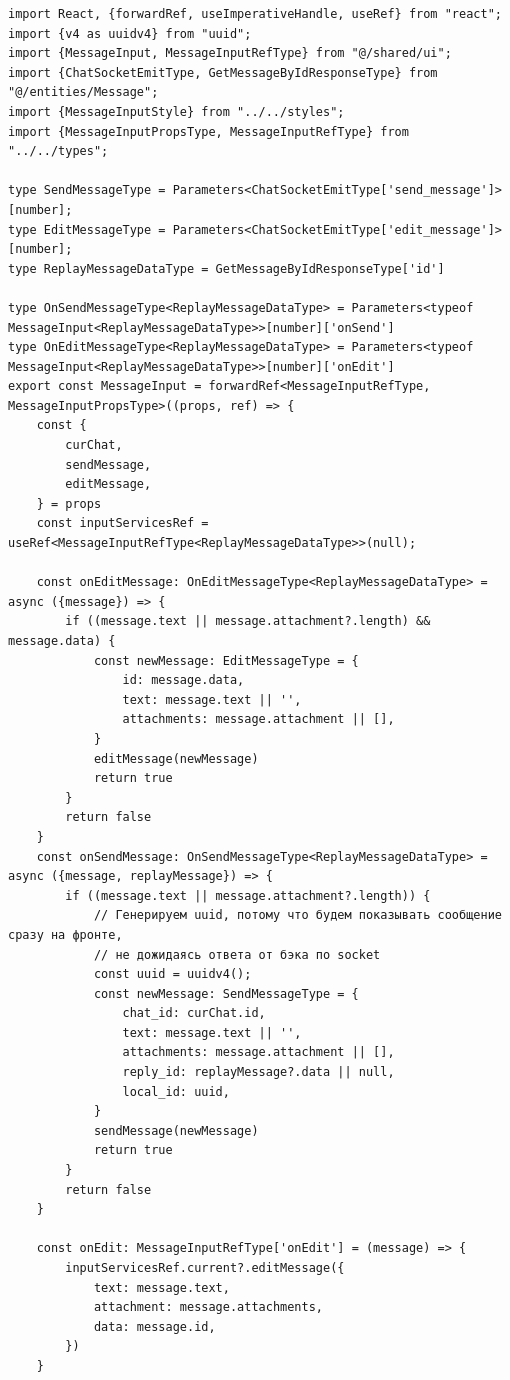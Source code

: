 \begin{lstlisting}
import React, {forwardRef, useImperativeHandle, useRef} from "react";
import {v4 as uuidv4} from "uuid";
import {MessageInput, MessageInputRefType} from "@/shared/ui";
import {ChatSocketEmitType, GetMessageByIdResponseType} from "@/entities/Message";
import {MessageInputStyle} from "../../styles";
import {MessageInputPropsType, MessageInputRefType} from "../../types";

type SendMessageType = Parameters<ChatSocketEmitType['send_message']>[number];
type EditMessageType = Parameters<ChatSocketEmitType['edit_message']>[number];
type ReplayMessageDataType = GetMessageByIdResponseType['id']

type OnSendMessageType<ReplayMessageDataType> = Parameters<typeof MessageInput<ReplayMessageDataType>>[number]['onSend']
type OnEditMessageType<ReplayMessageDataType> = Parameters<typeof MessageInput<ReplayMessageDataType>>[number]['onEdit']
export const MessageInput = forwardRef<MessageInputRefType, MessageInputPropsType>((props, ref) => {
    const {
        curChat,
        sendMessage,
        editMessage,
    } = props
    const inputServicesRef = useRef<MessageInputRefType<ReplayMessageDataType>>(null);

    const onEditMessage: OnEditMessageType<ReplayMessageDataType> = async ({message}) => {
        if ((message.text || message.attachment?.length) && message.data) {
            const newMessage: EditMessageType = {
                id: message.data,
                text: message.text || '',
                attachments: message.attachment || [],
            }
            editMessage(newMessage)
            return true
        }
        return false
    }
    const onSendMessage: OnSendMessageType<ReplayMessageDataType> = async ({message, replayMessage}) => {
        if ((message.text || message.attachment?.length)) {
            // Генерируем uuid, потому что будем показывать сообщение сразу на фронте,
            // не дожидаясь ответа от бэка по socket
            const uuid = uuidv4();
            const newMessage: SendMessageType = {
                chat_id: curChat.id,
                text: message.text || '',
                attachments: message.attachment || [],
                reply_id: replayMessage?.data || null,
                local_id: uuid,
            }
            sendMessage(newMessage)
            return true
        }
        return false
    }

    const onEdit: MessageInputRefType['onEdit'] = (message) => {
        inputServicesRef.current?.editMessage({
            text: message.text,
            attachment: message.attachments,
            data: message.id,
        })
    }


\end{lstlisting}
